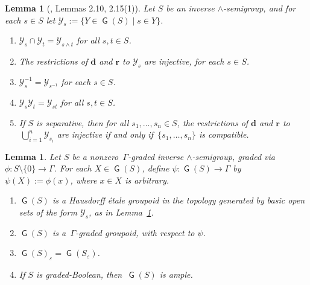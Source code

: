 \documentclass[a4paper,reqno,12pt]{amsart}
\numberwithin{equation}{section}
\theoremstyle{plain}
\newtheorem{lemma}[thm]{Lemma}
\theoremstyle{definition}
\newcommand{\ran}{\bm{r}}
\newcommand{\domr}{\bm{d}}
\newcommand{\GP}{\operatorname{\mathsf{G}}}
\begin{document}
\begin{lemma}[\cite{Lawson3}, Lemmas 2.10, 2.15(1)] \label{inv-slice}
Let $S$ be an inverse $\land$-semigroup, and for each $s \in S$ let $\mathcal{Y}_s := \{Y \in \GP(S) \mid s \in Y\}$.
\begin{enumerate}[\upshape(1)]
\item $\mathcal{Y}_s \cap \mathcal{Y}_t = \mathcal{Y}_{s\land t}$ for all $s,t \in S$.

\smallskip 

\item The restrictions of $\domr$ and $\ran$ to $\mathcal{Y}_s$ are injective, for each $s \in S$.

\smallskip 

\item $\mathcal{Y}_s^{-1} = \mathcal{Y}_{s^{-1}}$ for each $s \in S$.

\smallskip 

\item $\mathcal{Y}_s\mathcal{Y}_t = \mathcal{Y}_{st}$ for all $s,t \in S$.

\smallskip 

\item If $S$ is separative, then for all $s_1, \dots, s_n \in S$, the restrictions of $\domr$ and $\ran$ to $\, \bigcup_{i=1}^n \mathcal{Y}_{s_i}$ are injective if and only if $\, \{s_1, \dots, s_n\}$ is compatible.
\end{enumerate}
\end{lemma}

\begin{lemma} \label{gr-gp-obj}
Let $S$ be a nonzero $\, \Gamma$-graded inverse $\land$-semigroup, graded via $\phi : S\setminus \{0\} \to \Gamma$. For each $X \in \GP(S)$, define $\psi: \GP(S) \to \Gamma$ by $\psi(X) := \phi(x)$, where $x \in X$ is arbitrary. 
\begin{enumerate}[\upshape(1)]
\item $\GP(S)$ is a Hausdorff \'etale groupoid in the topology generated by basic open sets of the form $\mathcal{Y}_s$, as in Lemma~\ref{inv-slice}. 

\smallskip

\item $\GP(S)$ is a $\, \Gamma$-graded groupoid, with respect to $\psi$.

\smallskip

\item $\GP(S)_{\varepsilon} = \GP(S_{\varepsilon})$.

\smallskip

\item If $S$ is graded-Boolean, then $\, \GP(S)$ is ample.
\end{enumerate}
\end{lemma}
\end{document}
